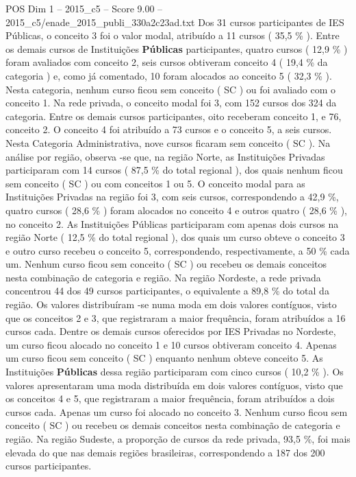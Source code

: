 \begin{textsample}{POS Dim 1 – 2015\_c5 – Score 9.00 – 2015\_c5/enade\_2015\_publi\_330a2c23ad.txt}
Dos 31 cursos participantes de IES Públicas, o conceito 3 foi o valor modal, atribuído a 11 cursos ( 35,5 \% ).
Entre os demais cursos de Instituições \textbf{Públicas} participantes, quatro cursos ( 12,9 \% ) foram avaliados com conceito 2, seis cursos obtiveram conceito 4 ( 19,4 \% da categoria ) e, como já comentado, 10 foram alocados ao conceito 5 ( 32,3 \% ).
Nesta categoria, nenhum curso ficou sem conceito ( SC ) ou foi avaliado com o conceito 1.
Na rede privada, o conceito modal foi 3, com 152 cursos dos 324 da categoria.
Entre os demais cursos participantes, oito receberam conceito 1, e 76, conceito 2.
O conceito 4 foi atribuído a 73 cursos e o conceito 5, a seis cursos.
Nesta Categoria Administrativa, nove cursos ficaram sem conceito ( SC ).
Na análise por região, observa -se que, na região Norte, as Instituições Privadas participaram com 14 cursos ( 87,5 \% do total regional ), dos quais nenhum ficou sem conceito ( SC ) ou com conceitos 1 ou 5.
O conceito modal para as Instituições Privadas na região foi 3, com seis cursos, correspondendo a 42,9 \%, quatro cursos ( 28,6 \% ) foram alocados no conceito 4 e outros quatro ( 28,6 \% ), no conceito 2.
As Instituições Públicas participaram com apenas dois cursos na região Norte ( 12,5 \% do total regional ), dos quais um curso obteve o conceito 3 e outro curso recebeu o conceito 5, correspondendo, respectivamente, a 50 \% cada um.
Nenhum curso ficou sem conceito ( SC ) ou recebeu os demais conceitos nesta combinação de categoria e região.
Na região Nordeste, a rede privada concentrou 44 dos 49 cursos participantes, o equivalente a 89,8 \% do total da região.
Os valores distribuíram -se numa moda em dois valores contíguos, visto que os conceitos 2 e 3, que registraram a maior frequência, foram atribuídos a 16 cursos cada.
Dentre os demais cursos oferecidos por IES Privadas no Nordeste, um curso ficou alocado no conceito 1 e 10 cursos obtiveram conceito 4.
Apenas um curso ficou sem conceito ( SC ) enquanto nenhum obteve conceito 5.
As Instituições \textbf{Públicas} dessa região participaram com cinco cursos ( 10,2 \% ).
Os valores apresentaram uma moda distribuída em dois valores contíguos, visto que os conceitos 4 e 5, que registraram a maior frequência, foram atribuídos a dois cursos cada.
Apenas um curso foi alocado no conceito 3.
Nenhum curso ficou sem conceito ( SC ) ou recebeu os demais conceitos nesta combinação de categoria e região.
Na região Sudeste, a proporção de cursos da rede privada, 93,5 \%, foi mais elevada do que nas demais regiões brasileiras, correspondendo a 187 dos 200 cursos participantes.

\end{textsample}
